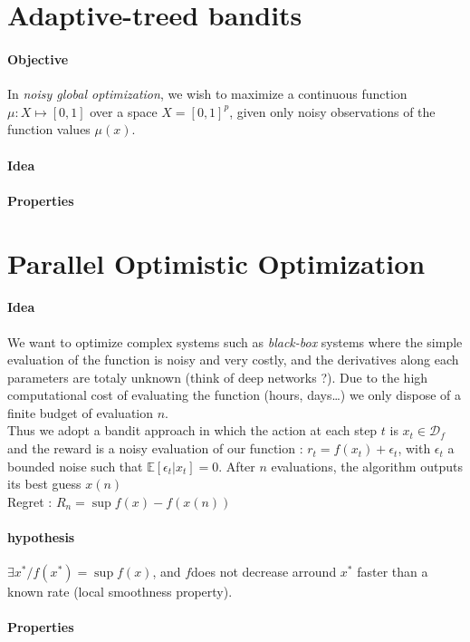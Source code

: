 \documentclass[a4paper,11pt,titlepage]{article}
\begin{document}
\section{Adaptive-treed bandits}
\paragraph{Objective}
In \textit{noisy global optimization}, we wish to maximize a continuous function $\mu :X \mapsto [0, 1]$ over a space $X = [0, 1]^p$, given only noisy observations of the function values $\mu(x)$.
\paragraph{Idea}
\paragraph{Properties}


\section{Parallel Optimistic Optimization}
\paragraph{Idea}
We want to optimize complex systems such as \textit{black-box} systems where the simple evaluation of the function is noisy and very costly, and the derivatives along each parameters are totaly unknown (think of deep networks ?). Due to the high computational cost of evaluating the function (hours, days\dots) we only dispose of a finite budget of evaluation $n$. \\
Thus we adopt a bandit approach in which the action at each step $t$ is $x_t \in \mathcal{D}_f$ and the reward is a noisy evaluation of our function : $r_t = f(x_t) +\epsilon_t$, with $\epsilon_t$ a bounded noise such that $\mathds{E}[\epsilon_t|x_t] = 0$. After $n$ evaluations, the algorithm outputs its best guess $x(n)$\\
Regret : $R_n = \sup f(x) - f(x(n))$

\paragraph{hypothesis}
$\exists x^* / f(x^*) = \sup f(x)$, and $f$does not decrease arround $x^*$ faster than a known rate (local smoothness property).
\paragraph{Properties}
\end{document}
